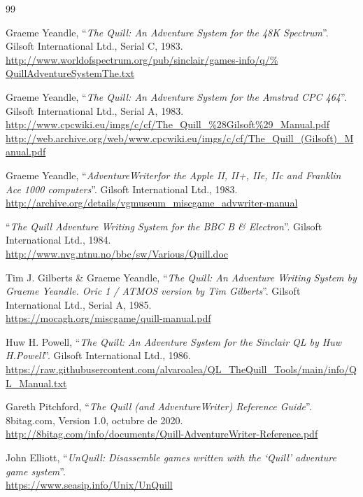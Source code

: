 \documentclass[11pt, a5paper]{article}
\begin{document}
\begin{thebibliography}{99}

  Graeme Yeandle,
  ``\emph{The Quill: An Adventure System for the 48K Spectrum}''.
  Gilsoft International Ltd.,
  Serial C,
  1983.\\
  \url{http://www.worldofspectrum.org/pub/sinclair/games-info/q/%
       QuillAdventureSystemThe.txt}

  Graeme Yeandle,
  ``\emph{The Quill: An Adventure System for the Amstrad CPC 464}''.
  Gilsoft International Ltd.,
  Serial A,
  1983.\\
  \url{http://www.cpcwiki.eu/imgs/c/cf/The_Quill_%28Gilsoft%29_Manual.pdf}\\
  \url{http://web.archive.org/web/www.cpcwiki.eu/imgs/c/cf/The_Quill_(Gilsoft)_Manual.pdf}

  Graeme Yeandle,
  ``\emph{AdventureWriter\texttrademark for the Apple II, II+, IIe, IIc and Franklin Ace 1000 computers}''.
  Gilsoft International Ltd.,
  1983.\\
  \url{http://archive.org/details/vgmuseum_miscgame_advwriter-manual}

  ``\emph{The Quill Adventure Writing System for the BBC B \& Electron}''.
  Gilsoft International Ltd.,
  1984.\\
  \url{http://www.nvg.ntnu.no/bbc/sw/Various/Quill.doc}

  Tim J. Gilberts \& Graeme Yeandle,
  ``\emph{The Quill: An Adventure Writing System by Graeme Yeandle. Oric 1 /
  ATMOS version by Tim Gilberts}''.
  Gilsoft International Ltd.,
  Serial A,
  1985.\\
  \url{https://mocagh.org/miscgame/quill-manual.pdf}

  Huw H. Powell,
  ``\emph{The Quill: An Adventure System for the Sinclair QL by Huw H.Powell}''.
  Gilsoft International Ltd.,
  1986.\\
  \url{https://raw.githubusercontent.com/alvaroalea/QL_TheQuill_Tools/main/info/QL_Manual.txt}

  Gareth Pitchford,
  ``\emph{The Quill (and AdventureWriter) Reference Guide}''.
  8bitag.com,
  Version 1.0,
  octubre de 2020.\\
  \url{http://8bitag.com/info/documents/Quill-AdventureWriter-Reference.pdf}

  John Elliott,
  ``\emph{UnQuill: Disassemble games written with the `Quill' adventure game system}''.\\
  \url{https://www.seasip.info/Unix/UnQuill}


\end{thebibliography}
\end{document}
